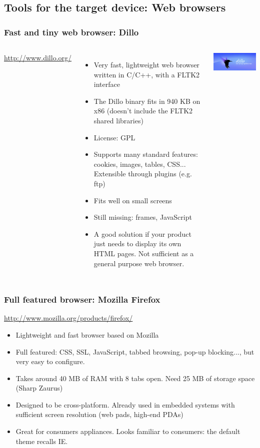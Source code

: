 \subsection[Web Browsers]{Tools for the target device: Web browsers}

\begin{frame}
  \frametitle{Fast and tiny web browser: Dillo}
  \begin{columns}[T]
    \url{http://www.dillo.org/}
    \begin{itemize}
    \item Very fast, lightweight web browser written in C/C++, with a
      FLTK2 interface
    \item The Dillo binary fits in 940 KB on x86 (doesn't include the
      FLTK2 shared libraries)
    \item License: GPL
    \item Supports many standard features: cookies, images, tables,
      CSS...  Extensible through plugins (e.g. ftp)
    \item Fits well on small screens
    \item Still missing: frames, JavaScript
    \item A good solution if your product just needs to display its
      own HTML pages.  Not sufficient as a general purpose web
      browser.
    \end{itemize}
    \includegraphics[width=\textwidth]{slides/sysdev-embedded-linux/dillo.png}
  \end{columns}
\end{frame}

\begin{frame}
  \frametitle{Full featured browser: Mozilla Firefox}
  \url{http://www.mozilla.org/products/firefox/}
  \begin{itemize}
  \item Lightweight and fast browser based on Mozilla
  \item Full featured: CSS, SSL, JavaScript, tabbed browsing, pop-up
    blocking..., but very easy to configure.
  \item Takes around 40 MB of RAM with 8 tabs open. Need 25 MB of
    storage space (Sharp Zaurus)
  \item Designed to be cross-platform. Already used in embedded
    systems with sufficient screen resolution (web pads, high-end
    PDAs)
  \item Great for consumers appliances. Looks familiar to consumers:
    the default theme recalls IE.
  \end{itemize}
\end{frame}

